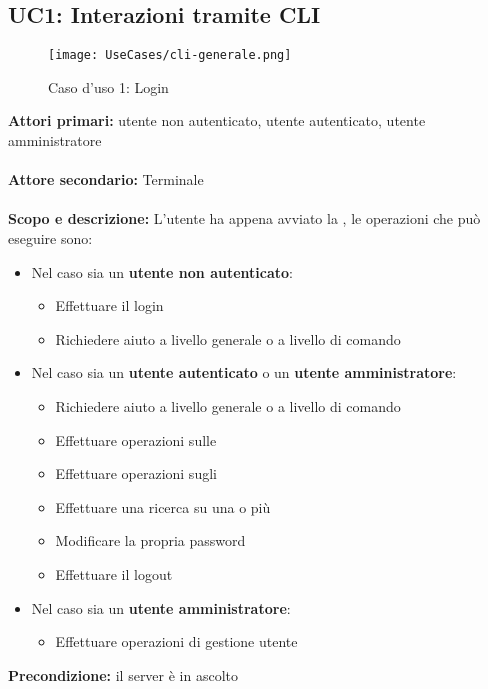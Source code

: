 \documentclass{scalatekids-article}
\begin{document}
\subsection{UC1: Interazioni tramite CLI}
\begin{figure}[H]
  \begin{center}
    \texttt{[image: UseCases/cli-generale.png]}
    \caption*{Caso d'uso 1: Login}
  \end{center}
\end{figure}
\textbf{Attori primari:} utente non autenticato, utente autenticato, utente amministratore\\ \\
\textbf{Attore secondario:} Terminale\\ \\
\textbf{Scopo e descrizione:} L'utente ha appena avviato la , le operazioni che può eseguire sono:
\begin{itemize}
  \item Nel caso sia un \textbf{utente non autenticato}:
  \begin{itemize}
    \item Effettuare il login
    \item Richiedere aiuto a livello generale o a livello di comando
  \end{itemize}
  \item Nel caso sia un \textbf{utente autenticato} o un \textbf{utente amministratore}:
  \begin{itemize}
    \item Richiedere aiuto a livello generale o a livello di comando
    \item Effettuare operazioni sulle 
    \item Effettuare operazioni sugli 
    \item Effettuare una ricerca su una o più 
    \item Modificare la propria password
    \item Effettuare il logout
  \end{itemize}
  \item Nel caso sia un \textbf{utente amministratore}:
  \begin{itemize}
    \item Effettuare operazioni di gestione utente
  \end{itemize}
\end{itemize}
\textbf{Precondizione:} il server è in ascolto\\ \\
\end{document}
